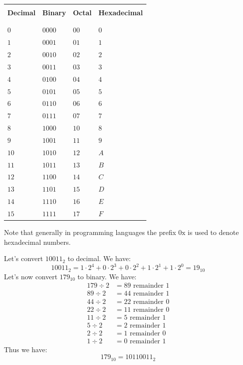 \begin{center}
\begin{tabular}{
>{\centering\arraybackslash}p{} |
>{\centering\arraybackslash}p{} |
>{\centering\arraybackslash}p{} |
>{\centering\arraybackslash}p{}
}
&&\\ \textbf{Decimal} & \textbf{Binary} & \textbf{Octal} & \textbf{Hexadecimal} \\ &&\\ \hline &&\\
$0$  & $0000$ & $00$ & $0$ \\
$1$  & $0001$ & $01$ & $1$ \\
$2$  & $0010$ & $02$ & $2$ \\
$3$  & $0011$ & $03$ & $3$ \\
$4$  & $0100$ & $04$ & $4$ \\
$5$  & $0101$ & $05$ & $5$ \\
$6$  & $0110$ & $06$ & $6$ \\
$7$  & $0111$ & $07$ & $7$ \\
$8$  & $1000$ & $10$ & $8$ \\
$9$  & $1001$ & $11$ & $9$ \\
$10$ & $1010$ & $12$ & $A$ \\
$11$ & $1011$ & $13$ & $B$ \\
$12$ & $1100$ & $14$ & $C$ \\
$13$ & $1101$ & $15$ & $D$ \\
$14$ & $1110$ & $16$ & $E$ \\
$15$ & $1111$ & $17$ & $F$ \\
\end{tabular}
\end{center}
Note that generally in programming languages the prefix $0\text{x}$ is used to denote hexadecimal numbers.

\begin{eg}
    Let's convert $10011_2$ to decimal. We have:
    \[
        10011_2 = 1 \cdot 2^4 + 0 \cdot 2^3 + 0 \cdot 2^2 + 1 \cdot 2^1 + 1 \cdot 2^0 = 19_{10}
    \]
    Let's now convert $179_{10}$ to binary. We have:
    \begin{align*}
        179 \div 2 &= 89 \text{ remainder } 1 \\
        89 \div 2 &= 44 \text{ remainder } 1 \\
        44 \div 2 &= 22 \text{ remainder } 0 \\
        22 \div 2 &= 11 \text{ remainder } 0 \\
        11 \div 2 &= 5 \text{ remainder } 1 \\
        5 \div 2 &= 2 \text{ remainder } 1 \\
        2 \div 2 &= 1 \text{ remainder } 0 \\
        1 \div 2 &= 0 \text{ remainder } 1
    \end{align*}
    Thus we have:
    \[
        179_{10} = 10110011_2
    \]
\end{eg}

